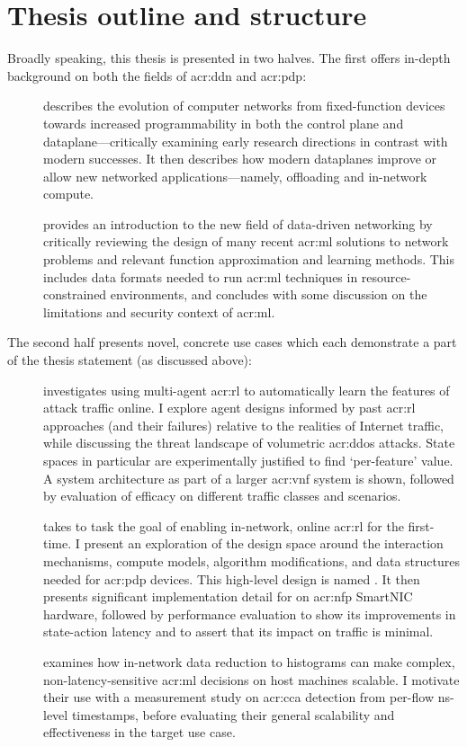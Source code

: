 \section{Thesis outline and structure}
Broadly speaking, this thesis is presented in two halves.
The first offers in-depth background on both the fields of \gls{acr:ddn} and \gls{acr:pdp}:
\begin{description}
	\item[] describes the evolution of computer networks from fixed-function devices towards increased programmability in both the control plane and dataplane---critically examining early research directions in contrast with modern successes. It then describes how modern dataplanes improve or allow new networked applications---namely, offloading and in-network compute.
	\item[] provides an introduction to the new field of data-driven networking by critically reviewing the design of many recent \gls{acr:ml} solutions to network problems and relevant function approximation and learning methods. This includes data formats needed to run \gls{acr:ml} techniques in resource-constrained environments, and concludes with some discussion on the limitations and security context of \gls{acr:ml}.
\end{description}
The second half presents novel, concrete use cases which each demonstrate a part of the thesis statement (as discussed above):
\begin{description}
	\item[] investigates using multi-agent \gls{acr:rl} to automatically learn the features of attack traffic online. I explore agent designs informed by past \gls{acr:rl} approaches (and their failures) relative to the realities of Internet traffic, while discussing the threat landscape of volumetric \gls{acr:ddos} attacks. State spaces in particular are experimentally justified to find `per-feature' value. A system architecture as part of a larger \gls{acr:vnf} system is shown, followed by evaluation of efficacy on different traffic classes and scenarios.
	\item[] takes to task the goal of enabling in-network, online \gls{acr:rl} for the first-time. I present an exploration of the design space around the interaction mechanisms, compute models, algorithm modifications, and data structures needed for \gls{acr:pdp} devices. This high-level design is named \approachshort{}. It then presents significant implementation detail for \approachshort{} on \gls{acr:nfp} SmartNIC hardware, followed by performance evaluation to show its improvements in state-action latency and to assert that its impact on traffic is minimal.
	\item[] examines how in-network data reduction to histograms can make complex, non-latency-sensitive \gls{acr:ml} decisions on host machines scalable. I motivate their use with a measurement study on \gls{acr:cca} detection from per-flow \unit{\nano\second}-level timestamps, before evaluating their general scalability and effectiveness in the target use case.
\end{description}
